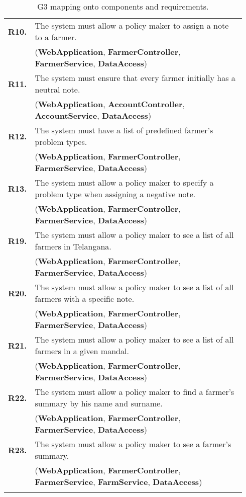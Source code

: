 \begin{longtable}{p{0.06\linewidth} p{0.88\linewidth}}
	\textbf{R10.} & The system must allow a policy maker to assign a note to a farmer.\\
	& (\textbf{WebApplication}, \textbf{FarmerController}, \textbf{FarmerService}, \textbf{DataAccess})\\
	\textbf{R11.} & The system must ensure that every farmer initially has a neutral note.\\	& (\textbf{WebApplication}, \textbf{AccountController}, \textbf{AccountService}, \textbf{DataAccess})\\
	\textbf{R12.} & The system must have a list of predefined farmer's problem types.\\
	& (\textbf{WebApplication}, \textbf{FarmerController}, \textbf{FarmerService}, \textbf{DataAccess}) \\
    \textbf{R13.} & The system must allow a policy maker to specify a problem type when assigning a negative note.\\
    & (\textbf{WebApplication}, \textbf{FarmerController}, \textbf{FarmerService}, \textbf{DataAccess})\\
	\textbf{R19.} & The system must allow a policy maker to see a list of all farmers in Telangana.\\
	& (\textbf{WebApplication}, \textbf{FarmerController}, \textbf{FarmerService}, \textbf{DataAccess})\\
	\textbf{R20.} & The system must allow a policy maker to see a list of all farmers with a specific note.\\
	& (\textbf{WebApplication}, \textbf{FarmerController}, \textbf{FarmerService}, \textbf{DataAccess})\\
	\textbf{R21.} & The system must allow a policy maker to see a list of all farmers in a given mandal.\\
	& (\textbf{WebApplication}, \textbf{FarmerController}, \textbf{FarmerService}, \textbf{DataAccess})\\
	\textbf{R22.} & The system must allow a policy maker to find a farmer's summary by his name and surname.\\
	& (\textbf{WebApplication}, \textbf{FarmerController}, \textbf{FarmerService}, \textbf{DataAccess})\\
	\textbf{R23.} & The system must allow a policy maker to see a farmer's summary.\\
	& (\textbf{WebApplication}, \textbf{FarmerController}, \textbf{FarmerService}, \textbf{FarmService}, \textbf{DataAccess})\\
    
    \bottomrule
\caption{G3 mapping onto components and requirements.}
\end{longtable}


